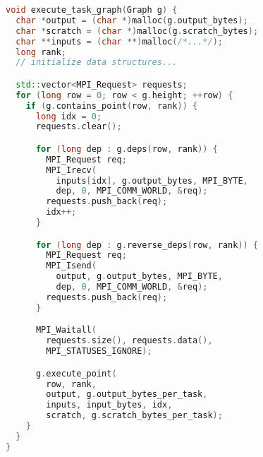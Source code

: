\begin{lstlisting}[language=C++,caption={Excerpt from Task Bench implementation in MPI.},label={lst:code-sample},style=codeblock,float]
void execute_task_graph(Graph g) {
  char *output = (char *)malloc(g.output_bytes);
  char *scratch = (char *)malloc(g.scratch_bytes);
  char **inputs = (char **)malloc(/*...*/);
  long rank;
  // initialize data structures...

  std::vector<MPI_Request> requests;
  for (long row = 0; row < g.height; ++row) {
    if (g.contains_point(row, rank)) {
      long idx = 0;
      requests.clear();

      for (long dep : g.deps(row, rank)) {
        MPI_Request req;
        MPI_Irecv(
          inputs[idx], g.output_bytes, MPI_BYTE,
          dep, 0, MPI_COMM_WORLD, &req);
        requests.push_back(req);
        idx++;
      }

      for (long dep : g.reverse_deps(row, rank)) {
        MPI_Request req;
        MPI_Isend(
          output, g.output_bytes, MPI_BYTE,
          dep, 0, MPI_COMM_WORLD, &req);
        requests.push_back(req);
      }

      MPI_Waitall(
        requests.size(), requests.data(),
        MPI_STATUSES_IGNORE);

      g.execute_point(
        row, rank,
        output, g.output_bytes_per_task,
        inputs, input_bytes, idx,
        scratch, g.scratch_bytes_per_task);
    }
  }
}
\end{lstlisting}
